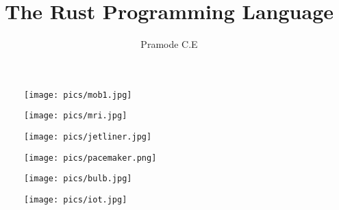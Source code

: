 \documentclass{beamer}
\title{The Rust Programming Language}
\author{Pramode C.E}
\institute {
  \texttt{http://pramode.net}
}
\begin{document}

\begin{frame}[plain]
  \titlepage
\end{frame}

\begin{frame}{}

\begin{figure}
\texttt{[image: pics/mob1.jpg]}
\end{figure}

\end{frame}

\begin{frame}{}

\begin{figure}
\texttt{[image: pics/mri.jpg]}
\end{figure}

\end{frame}

\begin{frame}{}

\begin{figure}
\texttt{[image: pics/jetliner.jpg]}
\end{figure}

\end{frame}

\begin{frame}{}

\begin{figure}
\texttt{[image: pics/pacemaker.png]}
\end{figure}

\end{frame}

\begin{frame}{}

\begin{figure}
\texttt{[image: pics/bulb.jpg]}
\end{figure}

\end{frame}

\begin{frame}{}

\begin{figure}
\texttt{[image: pics/iot.jpg]}
\end{figure}

\end{frame}
\end{document}
